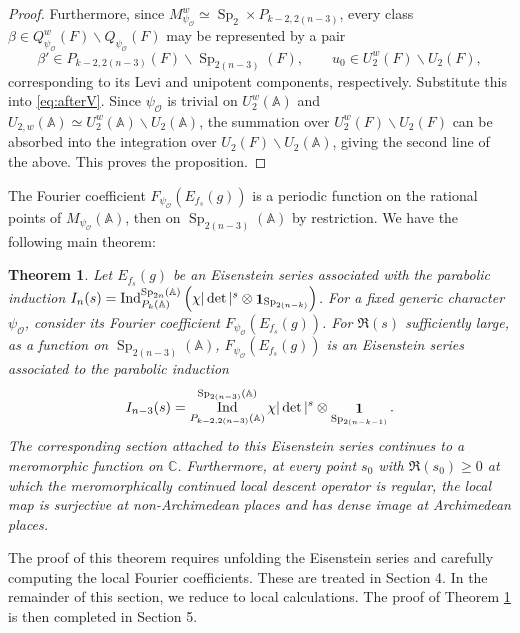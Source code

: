 \documentclass[11pt,notitlepage]{amsart}
\newtheorem{theorem}{Theorem}[section]
\theoremstyle{definition}
\theoremstyle{remark}
\newcommand{\calO}{\mathcal{O}}
\newcommand{\bbA}{\mathbb{A}}
\newcommand{\bbC}{\mathbb{C}}
\DeclareMathOperator{\id}{{\bf 1}}
\DeclareMathOperator{\Sp}{Sp}
\DeclareMathOperator{\Ind}{Ind}
\begin{document}
\begin{proof}
Furthermore, since $M^w_{\psi_{\mathcal O}}\simeq \Sp_2\times P_{k-2,2(n-3)}$, every class
$\beta\in Q^w_{\psi_{\mathcal O}}(F)\backslash Q_{\psi_{\mathcal O}}(F)$ may be represented by a pair
\[
\beta'\in P_{k-2,2(n-3)}(F)\backslash \Sp_{2(n-3)}(F),
\qquad
u_0\in U_2^w(F)\backslash U_2(F),
\]
corresponding to its Levi and unipotent components, respectively. Substitute this into \eqref{eq:afterV}. Since $\psi_{\mathcal O}$ is trivial on
$U_2^w(\bbA)$ and $U_{2,w}(\bbA)\simeq U_2^w(\bbA)\backslash U_2(\bbA)$, the summation over $U_2^w(F)\backslash U_2(F)$ can be absorbed into the integration over
$U_2(F)\backslash U_2(\bbA)$, giving the second line of the above. This proves the proposition.
\end{proof}

The Fourier coefficient $F_{\psi_\calO}(E_{f_s}(g))$ is a periodic function on the rational points of $M_{\psi_\calO}(\bbA)$, then on $\Sp_{2(n-3)}(\bbA)$ by restriction. We have the following main theorem:
\begin{theorem}\label{thm401}
  Let $E_{f_s}(g)$ be an Eisenstein series associated with the parabolic induction $ I_n(s)=\Ind_{P_k(\bbA)}^{\Sp_{2n}(\bbA)}\left(\chi|\det|^s\otimes \id_{\Sp_{2(n-k)}}\right)$. For a fixed generic character $\psi_\calO$, consider its Fourier coefficient $F_{\psi_\calO}(E_{f_s}(g))$. For $\Re(s)$ sufficiently large, as a function on $\Sp_{2(n-3)}(\bbA)$, $F_{\psi_\calO}(E_{f_s}(g))$ is an Eisenstein series associated to the parabolic induction 
  \[
  I_{n-3}(s) = \Ind_{P_{k-2,2(n-3)}(\bbA)}^{\Sp_{2(n-3)}(\bbA)} \chi|\det|^{s}\otimes \id_{\Sp_{2(n-k-1)}}.
  \]
  The corresponding section attached to this Eisenstein series continues to a meromorphic function on $\bbC$. Furthermore, at every point \(s_0\) with \(\Re(s_0)\ge0\) at which
the meromorphically continued local descent operator is regular,
the local map is surjective at non-Archimedean places and has dense
image at Archimedean places.
\end{theorem}

The proof of this theorem requires unfolding the Eisenstein series and carefully computing the local Fourier coefficients. These are treated in Section 4. In the remainder of this section, we reduce to local calculations. The proof of Theorem \ref{thm401} is then completed in Section 5.
\end{document}
